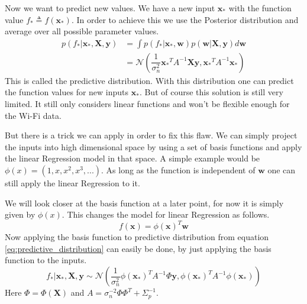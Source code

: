 Now we want to predict new values. We have a new input $\mathbf{x_*}$ with the function value $f_* \triangleq f(\mathbf{x_*})$. In order to achieve this we use the \gls{Posterior} distribution and average over all possible parameter values\citep[p. 11]{Rasmussen:2005:GPM:1162254}.
\begin{equation}\label{eq:predictive_distribution}
\begin{aligned}
p(f_*|\mathbf{x_*},\mathbf{X},\mathbf{y}) &= \int p(f_*|\mathbf{x_*},\mathbf{w})p(\mathbf{w}|\mathbf{X},\mathbf{y})d\mathbf{w}\\
&= \mathcal{N}(\dfrac{1}{\sigma_n^2}\mathbf{x_*}^TA^{-1}\mathbf{X}\mathbf{y},\mathbf{x_*}^TA^{-1}\mathbf{x_*})
\end{aligned}
\end{equation}
This is called the predictive distribution. With this distribution one can predict the function values for new inputs $\mathbf{x_*}$. But of course this solution is still very limited. It still only considers linear functions and won't be flexible enough for the Wi-Fi data. 

But there is a trick we can apply in order to fix this flaw. We can simply project the inputs into high dimensional space by using a set of basis functions and apply the linear \gls{Regression} model in that space. A simple example would be $\phi(x) = (1,x,x^2,x^3,...)$. As long as the function is independent of $\mathbf{w}$ one can still apply the linear \gls{Regression} to it\citep[p. 11]{Rasmussen:2005:GPM:1162254}.

We will look closer at the basis function at a later point, for now it is simply given by $\phi(x)$. This changes the model for linear \gls{Regression} as follows\citep[p. 12]{Rasmussen:2005:GPM:1162254}.
\begin{equation}\label{eq:basis_function}
f(\mathbf{x}) = \phi(\mathbf{x})^T\mathbf{w}
\end{equation}
Now applying the basis function to predictive distribution from equation \ref{eq:predictive_distribution} can easily be done, by just applying the basis function to the inputs. 
\begin{equation}\label{eq:prediction_distri_basis_function}
f_*|\mathbf{x_*},\mathbf{X},\mathbf{y} \sim \mathcal{N}(\dfrac{1}{\sigma_n^2}\phi(\mathbf{x_*})^TA^{-1}\Phi\mathbf{y}, \phi(\mathbf{x_*})^TA^{-1}\phi(\mathbf{x_*}))
\end{equation}
Here $\Phi = \Phi(\mathbf{X})$ and $A = \sigma_n^{-2}\Phi\Phi^T+\Sigma_p^{-1}$.


